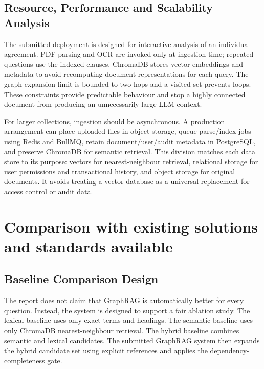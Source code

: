 \documentclass[12pt,a4paper,oneside]{report}
\begin{document}
\subsection{Resource, Performance and Scalability Analysis}
The submitted deployment is designed for interactive analysis of an individual agreement. PDF parsing and OCR are invoked only at ingestion time; repeated questions use the indexed clauses. ChromaDB stores vector embeddings and metadata to avoid recomputing document representations for each query. The graph expansion limit is bounded to two hops and a visited set prevents loops. These constraints provide predictable behaviour and stop a highly connected document from producing an unnecessarily large LLM context.

For larger collections, ingestion should be asynchronous. A production arrangement can place uploaded files in object storage, queue parse/index jobs using Redis and BullMQ, retain document/user/audit metadata in PostgreSQL, and preserve ChromaDB for semantic retrieval. This division matches each data store to its purpose: vectors for nearest-neighbour retrieval, relational storage for user permissions and transactional history, and object storage for original documents. It avoids treating a vector database as a universal replacement for access control or audit data.

\section{Comparison with existing solutions and standards available}
\subsection{Baseline Comparison Design}
The report does not claim that GraphRAG is automatically better for every question. Instead, the system is designed to support a fair ablation study. The lexical baseline uses only exact terms and headings. The semantic baseline uses only ChromaDB nearest-neighbour retrieval. The hybrid baseline combines semantic and lexical candidates. The submitted GraphRAG system then expands the hybrid candidate set using explicit references and applies the dependency-completeness gate.
\end{document}
